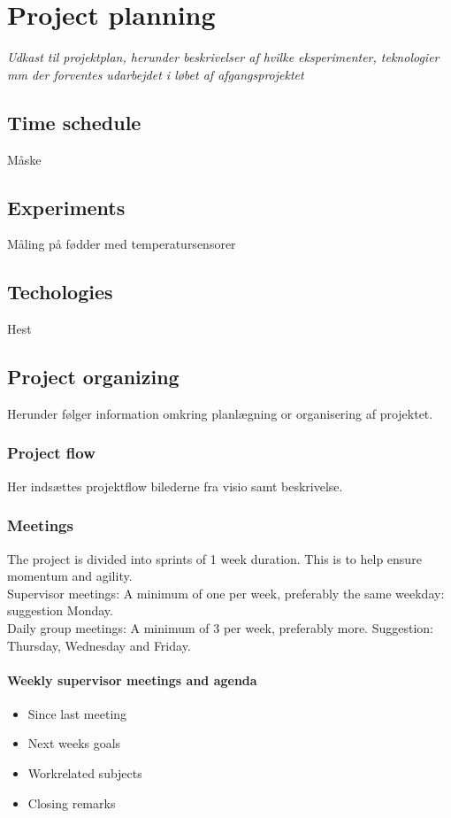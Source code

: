 \chapter{Project planning}
\textit{Udkast til projektplan, herunder beskrivelser af hvilke eksperimenter, teknologier mm der forventes udarbejdet i løbet af afgangsprojektet}\\

\section{Time schedule}
Måske

\section{Experiments}
Måling på fødder med temperatursensorer

\section{Techologies}
Hest

\section{Project organizing}
Herunder følger information omkring planlægning or organisering af projektet.
\subsection{Project flow}
Her indsættes projektflow bilederne fra visio samt beskrivelse.
\subsection{Meetings}
The project is divided into sprints of 1 week duration. This is to help ensure momentum and agility.\\
Supervisor meetings: A minimum of one per week, preferably the same weekday: suggestion Monday.\\
Daily group meetings: A minimum of 3 per week, preferably more. Suggestion: Thursday, Wednesday and Friday.
\subsubsection{Weekly supervisor meetings and agenda}
\begin{itemize}
\item Since last meeting
\item Next weeks goals
\item Workrelated subjects
\item Closing remarks
\end{itemize}
